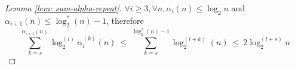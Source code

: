 \begin{proof}[Lemma \ref{lem: sum-alpha-repeat}]
  $\forall i\ge 3, \forall n, \alpha_i(n)\le \log_2n$ and $\alpha_{i+1}(n)\le \log_2^*(n)-1$, therefore
	\begin{equation*}
	\sum_{k=s}^{\alpha_{i+1}(n)} \log_2^{(l)}\alpha_i^{(k)}(n) \ \le \
	\sum_{k=s}^{\log_2^*(n)-1} \log_2^{(l+k)}(n) \ \le \
	2\log_2^{(l+s)} n
	\end{equation*}
\end{proof}
